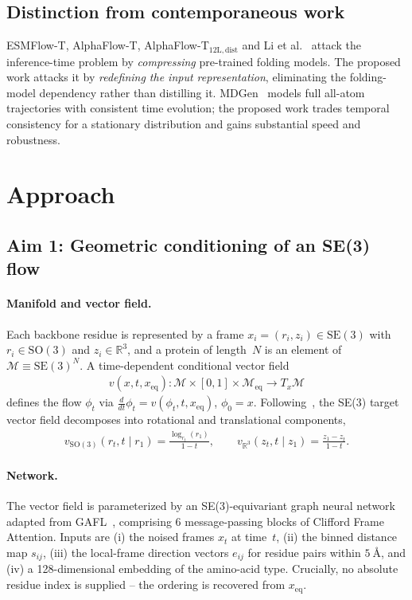 \documentclass[12pt]{article}
\begin{document}
\subsection{Distinction from contemporaneous work}
ESMFlow-T, AlphaFlow-T, AlphaFlow-T$_{12\mathrm{L,dist}}$ and Li et al.~\cite{li2024improving}
attack the inference-time problem by \emph{compressing} pre-trained folding
models. The proposed work attacks it by \emph{redefining the input
representation}, eliminating the folding-model dependency rather than
distilling it. MDGen~\cite{jing2024mdgen} models full all-atom trajectories
with consistent time evolution; the proposed work trades temporal consistency
for a stationary distribution and gains substantial speed and robustness.

\section{Approach}\label{sec:approach}

\subsection{Aim 1: Geometric conditioning of an SE(3) flow}

\paragraph{Manifold and vector field.}
Each backbone residue is represented by a frame $x_i = (r_i, z_i) \in
\mathrm{SE}(3)$ with $r_i \in \mathrm{SO}(3)$ and $z_i \in \mathbb{R}^3$, and a
protein of length~$N$ is an element of $\mathcal{M} \equiv \mathrm{SE}(3)^N$. A
time-dependent conditional vector field
\begin{align}
  v(x, t, x_{\mathrm{eq}}) : \mathcal{M} \times [0,1] \times \mathcal{M}_{\mathrm{eq}} \to T_x\mathcal{M}
\end{align}
defines the flow $\phi_t$ via $\frac{d}{dt}\phi_t = v(\phi_t, t, x_{\mathrm{eq}})$,
$\phi_0 = x$. Following~\cite{yim2023se3,bose2024se3}, the SE(3) target vector
field decomposes into rotational and translational components,
\begin{align}
  v_{\mathrm{SO}(3)}(r_t, t \mid r_1) = \frac{\log_{r_t}(r_1)}{1 - t}, \qquad
  v_{\mathbb{R}^3}(z_t, t \mid z_1) = \frac{z_1 - z_t}{1 - t}.
\end{align}

\paragraph{Network.}
The vector field is parameterized by an SE(3)-equivariant graph neural network
adapted from GAFL~\cite{wagner2024gafl}, comprising 6 message-passing blocks
of Clifford Frame Attention. Inputs are (i) the noised frames $x_t$ at time~$t$,
(ii) the binned distance map $s_{ij}$, (iii) the local-frame direction vectors
$e_{ij}$ for residue pairs within $5~$\AA, and (iv) a 128-dimensional embedding
of the amino-acid type. Crucially, no absolute residue index is supplied -- the
ordering is recovered from $x_{\mathrm{eq}}$.
\end{document}
